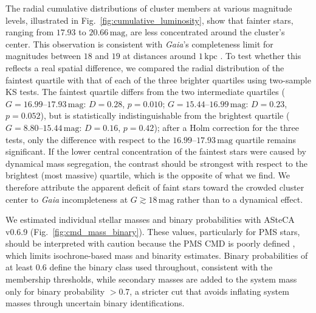 \documentclass{aa}
\begin{document}
The radial cumulative distributions of cluster members at various magnitude levels, illustrated in Fig.~\ref{fig:cumulative_luminosity}, show that fainter stars, ranging from $17.93$ to $20.66\,\mathrm{mag}$, are less concentrated around the cluster's center. This observation is consistent with \textit{Gaia}'s completeness limit for magnitudes between $18$ and $19$ at distances around $1\,\mathrm{kpc}$ \citep{2020MNRAS.497.4246B,2023AA...677A..37C}. To test whether this reflects a real spatial difference, we compared the radial distribution of the faintest quartile with that of each of the three brighter quartiles using two-sample KS tests. The faintest quartile differs from the two intermediate quartiles ($G=16.99$--$17.93\,\mathrm{mag}$: $D=0.28$, $p=0.010$; $G=15.44$--$16.99\,\mathrm{mag}$: $D=0.23$, $p=0.052$), but is statistically indistinguishable from the brightest quartile ($G=8.80$--$15.44\,\mathrm{mag}$: $D=0.16$, $p=0.42$); after a Holm correction for the three tests, only the difference with respect to the $16.99$--$17.93\,\mathrm{mag}$ quartile remains significant. If the lower central concentration of the faintest stars were caused by dynamical mass segregation, the contrast should be strongest with respect to the brightest (most massive) quartile, which is the opposite of what we find. We therefore attribute the apparent deficit of faint stars toward the crowded cluster center to \textit{Gaia} incompleteness at $G\gtrsim18\,\mathrm{mag}$ rather than to a dynamical effect.

We estimated individual stellar masses and binary probabilities with ASteCA v0.6.9 (Fig.~\ref{fig:cmd_mass_binary}). These values, particularly for PMS stars, should be interpreted with caution because the PMS CMD is poorly defined \citep{2010ApJ...723..166D}, which limits isochrone-based mass and binarity estimates. Binary probabilities of at least $0.6$ define the binary class used throughout, consistent with the membership thresholds, while secondary masses are added to the system mass only for binary probability $>0.7$, a stricter cut that avoids inflating system masses through uncertain binary identifications.
\end{document}
